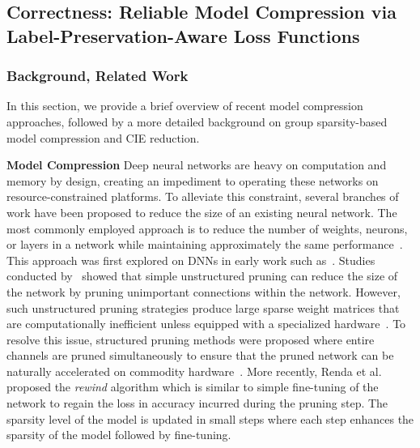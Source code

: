\subsection{Correctness: Reliable Model Compression via Label-Preservation-Aware Loss Functions}
\subsubsection{Background, Related Work}

In this section, we provide a brief overview of recent model compression approaches, followed by a more detailed background on group sparsity-based model compression and CIE reduction.

%
\noindent \textbf{Model Compression}
Deep neural networks are heavy on computation and memory by design,
%
creating an impediment to operating these networks on resource-constrained platforms.
%
%
To alleviate this constraint, several branches of work 
have been proposed to reduce the size of an existing
neural network.
%
%
The most commonly employed approach 
is to reduce the number of weights, neurons, or layers in a 
network while maintaining approximately the same
performance~\cite{joseph2020programmable}.
%
This approach was first explored on DNNs
in early work such as~\cite{lecun1990optimal,hassibi1994optimal}.
%
%
Studies conducted by~\cite{han2015learning,han2015deep} %
showed that simple unstructured pruning can reduce the size
of the network by pruning unimportant connections within the 
network. However, such unstructured pruning strategies produce large sparse weight matrices that are computationally inefficient unless equipped with a specialized hardware~\cite{numenta20}.
%
%
To resolve this issue, structured pruning methods were proposed 
where entire channels are pruned simultaneously to ensure that the pruned network can be naturally accelerated on commodity hardware~\cite{li2016pruning,hu2016network,wen2016learning}. %
%
More recently, Renda et al.~\cite{renda2020rewind} proposed the \textit{rewind} algorithm which is similar to simple fine-tuning of the network to regain the loss in accuracy incurred during the pruning step. The sparsity level of the model is updated in small steps where each step enhances the sparsity of the model followed by fine-tuning.
